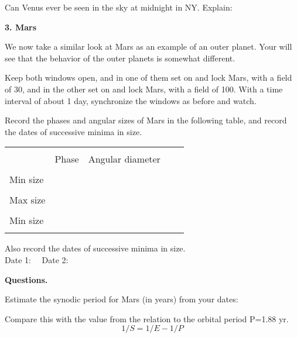 \medskip\noindent
Can Venus ever be seen in the sky at midnight in NY. Explain: \makebox[1cm]{\hrulefill} 



\medskip\bigskip
\noindent
{\bf 3. Mars }

\medskip
\noindent
We now take a similar look at Mars as an example of an
outer planet. Your will see that the behavior of the outer planets 
is somewhat different.

\medskip
Keep both windows open, and in one of them set on and lock Mars, with
a field of 30\arcsec, and in the other set on and lock Mars, with a
field of 100\deg. With a time interval of about 1 day, synchronize the
windows as before and watch.

Record the phases and angular sizes of Mars in the following table,
and record the dates of successive minima in size.



	\begin{center}
\begin{tabular}{lcccc} \hline \\ [-6pt]
   & \hspace{0.5cm} Phase
 \hspace{0.5cm} & \hspace{0.2cm} Angular diameter \hspace{0.2cm} &
 \hspace{0.5cm}   \\ [6pt]
\hline \\ [-6pt]
Min size  &  &  &    \\ \hline \\ [-6pt]
Max size &  &  &      \\ \hline \\ [-6pt]
Min size  &  &  &   \\ \hline \\ [-6pt]
\end{tabular}
\end{center}

\noindent
Also record the dates of successive minima in size.\\

\noindent
Date 1: \makebox[2cm] \ \  Date 2:  \makebox[2cm]  


\medskip\noindent
{\bf Questions.}

\medskip\noindent
Estimate the synodic period for Mars (in years) from your dates:
\makebox[4cm]{\hrulefill}

\medskip
\noindent
Compare this with the value from the relation to the orbital period
P=1.88 yr.
\[1/S = 1/E -1/P\]


